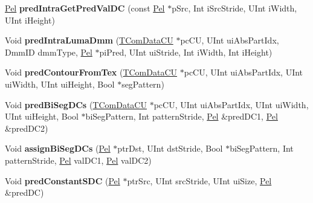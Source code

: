 \begin{DoxyCompactItemize}
\mbox{\label{class_t_com_prediction_ab83de3cc1bc0fba2589a9a47700b63ae}} 
\hyperlink{_type_def_8h_af92141699657699b4b547be0c8517541}{Pel} {\bfseries pred\+Intra\+Get\+Pred\+Val\+DC} (const \hyperlink{_type_def_8h_af92141699657699b4b547be0c8517541}{Pel} $\ast$p\+Src, Int i\+Src\+Stride, U\+Int i\+Width, U\+Int i\+Height)
\item 
\mbox{\label{class_t_com_prediction_a9e3e4687c7cf6306719d7770a6bd9b0c}} 
Void {\bfseries pred\+Intra\+Luma\+Dmm} (\hyperlink{class_t_com_data_c_u}{T\+Com\+Data\+CU} $\ast$pc\+CU, U\+Int ui\+Abs\+Part\+Idx, Dmm\+ID dmm\+Type, \hyperlink{_type_def_8h_af92141699657699b4b547be0c8517541}{Pel} $\ast$pi\+Pred, U\+Int ui\+Stride, Int i\+Width, Int i\+Height)
\item 
\mbox{\label{class_t_com_prediction_a8e73e0ac213b1493df66ec7a0a286bad}} 
Void {\bfseries pred\+Contour\+From\+Tex} (\hyperlink{class_t_com_data_c_u}{T\+Com\+Data\+CU} $\ast$pc\+CU, U\+Int ui\+Abs\+Part\+Idx, U\+Int ui\+Width, U\+Int ui\+Height, Bool $\ast$seg\+Pattern)
\item 
\mbox{\label{class_t_com_prediction_a89af8ba0aab9618ce4e6eca09664c5d1}} 
Void {\bfseries pred\+Bi\+Seg\+D\+Cs} (\hyperlink{class_t_com_data_c_u}{T\+Com\+Data\+CU} $\ast$pc\+CU, U\+Int ui\+Abs\+Part\+Idx, U\+Int ui\+Width, U\+Int ui\+Height, Bool $\ast$bi\+Seg\+Pattern, Int pattern\+Stride, \hyperlink{_type_def_8h_af92141699657699b4b547be0c8517541}{Pel} \&pred\+D\+C1, \hyperlink{_type_def_8h_af92141699657699b4b547be0c8517541}{Pel} \&pred\+D\+C2)
\item 
\mbox{\label{class_t_com_prediction_a4a80010e4dba0f3a479016d777e67ef0}} 
Void {\bfseries assign\+Bi\+Seg\+D\+Cs} (\hyperlink{_type_def_8h_af92141699657699b4b547be0c8517541}{Pel} $\ast$ptr\+Dst, U\+Int dst\+Stride, Bool $\ast$bi\+Seg\+Pattern, Int pattern\+Stride, \hyperlink{_type_def_8h_af92141699657699b4b547be0c8517541}{Pel} val\+D\+C1, \hyperlink{_type_def_8h_af92141699657699b4b547be0c8517541}{Pel} val\+D\+C2)
\item 
\mbox{\label{class_t_com_prediction_ab14ebbab06cedfb3164b8234ab4a8c55}} 
Void {\bfseries pred\+Constant\+S\+DC} (\hyperlink{_type_def_8h_af92141699657699b4b547be0c8517541}{Pel} $\ast$ptr\+Src, U\+Int src\+Stride, U\+Int ui\+Size, \hyperlink{_type_def_8h_af92141699657699b4b547be0c8517541}{Pel} \&pred\+DC)

\end{DoxyCompactItemize}
